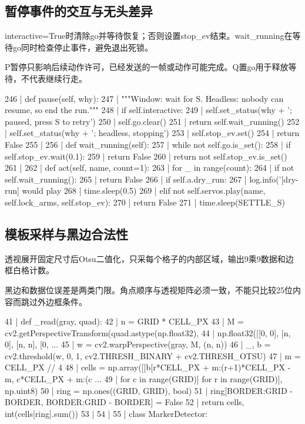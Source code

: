 \subsection{暂停事件的交互与无头差异}
interactive=True时清除go并等待恢复；否则设置stop\_ev结束。wait\_running在等待go同时检查停止事件，避免退出死锁。

P暂停只影响后续动作许可，已经发送的一帧或动作可能完成。Q置go用于释放等待，不代表继续行走。
\begin{CodeBlock}
 246 |     def pause(self, why):
 247 |         """Window: wait for S. Headless: nobody can resume, so end the run."""
 248 |         if self.interactive:
 249 |             self.set_status(why + '; paused, press S to retry')
 250 |             self.go.clear()
 251 |             return self.wait_running()
 252 |         self.set_status(why + '; headless, stopping')
 253 |         self.stop_ev.set()
 254 |         return False
 255 | 
 256 |     def wait_running(self):
 257 |         while not self.go.is_set():
 258 |             if self.stop_ev.wait(0.1):
 259 |                 return False
 260 |         return not self.stop_ev.is_set()
 261 | 
 262 |     def act(self, name, count=1):
 263 |         for _ in range(count):
 264 |             if not self.wait_running():
 265 |                 return False
 266 |             if self.a.dry_run:
 267 |                 log.info('[dry-run] would play %
 268 |                 time.sleep(0.5)
 269 |             elif not self.servos.play(name, self.lock_arms, self.stop_ev):
 270 |                 return False
 271 |         time.sleep(SETTLE_S)
\end{CodeBlock}
\subsection{模板采样与黑边合法性}
透视展开固定尺寸后Otsu二值化，只采每个格子的内部区域，输出9乘9数据和边框白格计数。

黑边和数据位误差是两类门限。角点顺序与透视矩阵必须一致，不能只比较25位内容而跳过外边框条件。
\begin{CodeBlock}
  41 | def _read(gray, quad):
  42 |     n = GRID * CELL_PX
  43 |     M = cv2.getPerspectiveTransform(quad.astype(np.float32),
  44 |                                     np.float32([[0, 0], [n, 0], [n, n], [0, ...
  45 |     w = cv2.warpPerspective(gray, M, (n, n))
  46 |     _, b = cv2.threshold(w, 0, 1, cv2.THRESH_BINARY + cv2.THRESH_OTSU)
  47 |     m = CELL_PX // 4
  48 |     cells = np.array([[b[r*CELL_PX + m:(r+1)*CELL_PX - m, c*CELL_PX + m:(c  ...
  49 |                        for c in range(GRID)] for r in range(GRID)], np.uint8)
  50 |     ring = np.ones((GRID, GRID), bool)
  51 |     ring[BORDER:GRID - BORDER, BORDER:GRID - BORDER] = False
  52 |     return cells, int(cells[ring].sum())
  53 | 
  54 | 
  55 | class MarkerDetector:
\end{CodeBlock}
